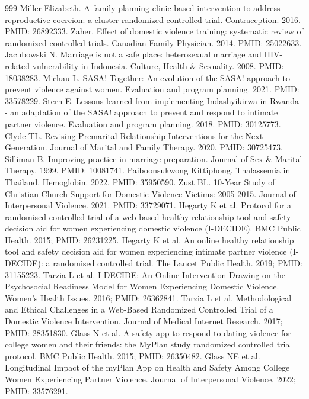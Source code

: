 \documentclass[11pt]{article}
\begin{document}
\begin{thebibliography}{999}
 Miller Elizabeth. A family planning clinic-based intervention to address reproductive coercion: a cluster randomized controlled trial. Contraception. 2016. PMID: 26892333.
 Zaher. Effect of domestic violence training: systematic review of randomized controlled trials. Canadian Family Physician. 2014. PMID: 25022633.
 Jacubowski N. Marriage is not a safe place: heterosexual marriage and HIV-related vulnerability in Indonesia. Culture, Health \& Sexuality. 2008. PMID: 18038283.
 Michau L. SASA! Together: An evolution of the SASA! approach to prevent violence against women. Evaluation and program planning. 2021. PMID: 33578229.
 Stern E. Lessons learned from implementing Indashyikirwa in Rwanda - an adaptation of the SASA! approach to prevent and respond to intimate partner violence. Evaluation and program planning. 2018. PMID: 30125773.
 Clyde TL. Revising Premarital Relationship Interventions for the Next Generation. Journal of Marital and Family Therapy. 2020. PMID: 30725473.
 Silliman B. Improving practice in marriage preparation. Journal of Sex \& Marital Therapy. 1999. PMID: 10081741.
 Paiboonsukwong Kittiphong. Thalassemia in Thailand. Hemoglobin. 2022. PMID: 35950590.
 Zust BL. 10-Year Study of Christian Church Support for Domestic Violence Victims: 2005-2015. Journal of Interpersonal Violence. 2021. PMID: 33729071.
 Hegarty K et al. Protocol for a randomised controlled trial of a web-based healthy relationship tool and safety decision aid for women experiencing domestic violence (I-DECIDE). BMC Public Health. 2015; PMID: 26231225.
 Hegarty K et al. An online healthy relationship tool and safety decision aid for women experiencing intimate partner violence (I-DECIDE): a randomised controlled trial. The Lancet Public Health. 2019; PMID: 31155223.
 Tarzia L et al. I-DECIDE: An Online Intervention Drawing on the Psychosocial Readiness Model for Women Experiencing Domestic Violence. Women's Health Issues. 2016; PMID: 26362841.
 Tarzia L et al. Methodological and Ethical Challenges in a Web-Based Randomized Controlled Trial of a Domestic Violence Intervention. Journal of Medical Internet Research. 2017; PMID: 28351830.
 Glass N et al. A safety app to respond to dating violence for college women and their friends: the MyPlan study randomized controlled trial protocol. BMC Public Health. 2015; PMID: 26350482.
 Glass NE et al. Longitudinal Impact of the myPlan App on Health and Safety Among College Women Experiencing Partner Violence. Journal of Interpersonal Violence. 2022; PMID: 33576291.

\end{thebibliography}
\end{document}
